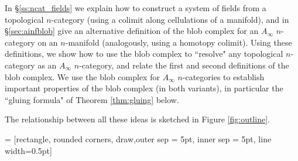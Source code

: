 In \S \ref{ss:ncat_fields}  we explain how to construct a system of fields from a topological $n$-category 
(using a colimit along cellulations of a manifold), and in \S \ref{sec:ainfblob} give an alternative definition 
of the blob complex for an $A_\infty$ $n$-category on an $n$-manifold (analogously, using a homotopy colimit).
Using these definitions, we show how to use the blob complex to ``resolve" any topological $n$-category as an 
$A_\infty$ $n$-category, and relate the first and second definitions of the blob complex.
We use the blob complex for $A_\infty$ $n$-categories to establish important properties of the blob complex (in both variants), 
in particular the ``gluing formula" of Theorem \ref{thm:gluing} below.

The relationship between all these ideas is sketched in Figure \ref{fig:outline}.

 = [rectangle, rounded corners, draw,outer sep = 5pt, inner sep = 5pt, line width=0.5pt]

